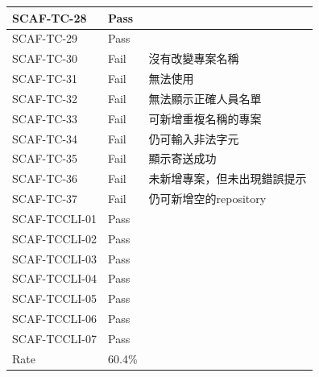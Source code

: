 \documentclass{report}
\begin{document}
\begin{tabularx}{\textwidth}{
  |p{}%
  |p{}%
  |p{}|%
}
  \hline
  SCAF-TC-28 & Pass &  \\ \hline
  SCAF-TC-29 & Pass &  \\ \hline
  SCAF-TC-30 & Fail & 沒有改變專案名稱 \\ \hline
  SCAF-TC-31 & Fail & 無法使用 \\ \hline
  SCAF-TC-32 & Fail & 無法顯示正確人員名單 \\ \hline
  SCAF-TC-33 & Fail & 可新增重複名稱的專案 \\ \hline
  SCAF-TC-34 & Fail & 仍可輸入非法字元 \\ \hline
  SCAF-TC-35 & Fail & 顯示寄送成功 \\ \hline
  SCAF-TC-36 & Fail & 未新增專案，但未出現錯誤提示 \\ \hline
  SCAF-TC-37 & Fail & 仍可新增空的repository \\ \hline
  SCAF-TCCLI-01 & Pass &  \\ \hline
  SCAF-TCCLI-02 & Pass &  \\ \hline
  SCAF-TCCLI-03 & Pass &  \\ \hline
  SCAF-TCCLI-04 & Pass &  \\ \hline
  SCAF-TCCLI-05 & Pass &  \\ \hline
  SCAF-TCCLI-06 & Pass &  \\ \hline
  SCAF-TCCLI-07 & Pass &  \\ \hline
  Rate & 60.4\% &  \\ \hline
\end{tabularx}
\\
\newline
\\
\end{document}
